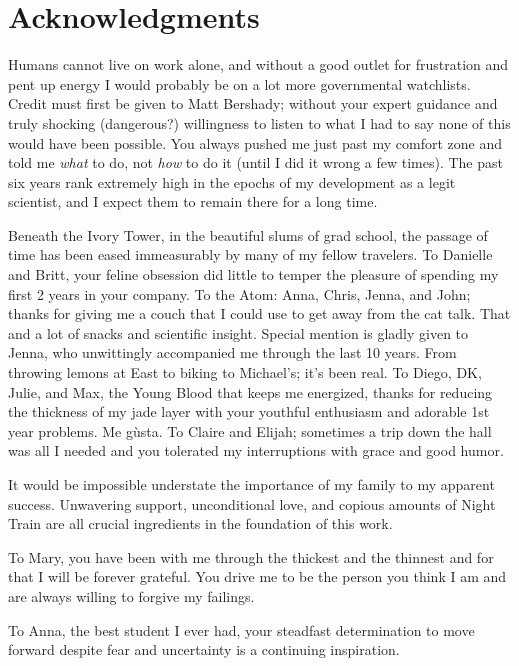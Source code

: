 \chapter*{Acknowledgments}

Humans cannot live on work alone, and without a good outlet for
frustration and pent up energy I would probably be on a lot more
governmental watchlists. Credit must first be given to Matt Bershady;
without your expert guidance and truly shocking (dangerous?)
willingness to listen to what I had to say none of this would have
been possible. You always pushed me just past my comfort zone and told
me \emph{what} to do, not \emph{how} to do it (until I did it wrong a
few times). The past six years rank extremely high in the epochs of my
development as a legit scientist, and I expect them to remain there
for a long time.

Beneath the Ivory Tower, in the beautiful slums of grad school, the
passage of time has been eased immeasurably by many of my fellow
travelers. To Danielle and Britt, your feline obsession did little to
temper the pleasure of spending my first 2 years in your company. To
the Atom: Anna, Chris, Jenna, and John; thanks for giving me a couch
that I could use to get away from the cat talk. That and a lot of
snacks and scientific insight. Special mention is gladly given to
Jenna, who unwittingly accompanied me through the last 10 years. From
throwing lemons at East to biking to Michael's; it's been real. To
Diego, DK, Julie, and Max, the Young Blood that keeps me energized,
thanks for reducing the thickness of my jade layer with your youthful
enthusiasm and adorable 1st year problems. Me g\`usta. To Claire and
Elijah; sometimes a trip down the hall was all I needed and you
tolerated my interruptions with grace and good humor.

It would be impossible understate the importance of my family to my
apparent success. Unwavering support, unconditional love, and copious
amounts of Night Train are all crucial ingredients in the foundation
of this work.

To Mary, you have been with me through the thickest and the thinnest
and for that I will be forever grateful. You drive me to be the person
you think I am and are always willing to forgive my failings.

To Anna, the best student I ever had, your steadfast determination to
move forward despite fear and uncertainty is a continuing inspiration.

